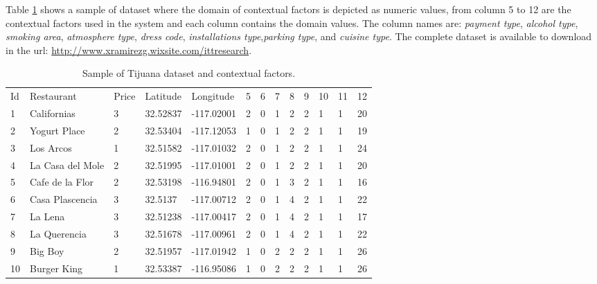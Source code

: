Table \ref{tab:dataset} shows a sample of dataset  where the domain
of contextual factors  is depicted as numeric values, from column 5 to
12  are the contextual factors used in the system and each column
contains the domain values.  The column names are: \textit{payment
type}, \textit{alcohol type}, \textit{smoking area},
\textit{atmosphere type}, \textit{dress code}, \textit{installations
type},\textit{parking type}, and \textit{cuisine type}.
The complete dataset is available to download in the url: 
\url{http://www.xramirezg.wixsite.com/ittresearch}.\\ 
\begin{table}
\small
\captionsetup{font=footnotesize}
\caption{Sample of Tijuana dataset and contextual factors.}
\label{tab:dataset} 
\begin{tabular}{lllllllllllll}
\hline\noalign{\smallskip}
Id &  Restaurant & Price & Latitude &  Longitude & 5 & 6 & 7 & 8 & 9 & 10 & 11 & 12   \\
\noalign{\smallskip}\hline\noalign{\smallskip}
1   &   Californias &   3   &   32.52837    &   -117.02001  &   2   &   0   &   1   &   2   &   2   &   1   &   1   &   20  \\
2   &   Yogurt Place    &   2   &   32.53404    &   -117.12053  &   1   &   0   &   1   &   2   &   2   &   1   &   1   &   19  \\
3   &   Los Arcos   &   1   &   32.51582    &   -117.01032  &   2   &   0   &   1   &   2   &   2   &   1   &   1   &   24  \\
4   &   La Casa del Mole &   2   &   32.51995    &   -117.01001  &   2   &   0   &   1   &   2   &   2   &   1   &   1   &   20  \\
5   &   Cafe de la Flor     &   2   &   32.53198    &   -116.94801  &   2   &   0   &   1   &   3   &   2   &   1   &   1   &   16  \\
6   &   Casa Plascencia &   3   &   32.5137 &   -117.00712  &   2   &   0   &   1   &   4   &   2   &   1   &   1   &   22  \\
7   &   La Lena &   3   &   32.51238    &   -117.00417  &   2   &   0   &   1   &   4   &   2   &   1   &   1   &   17  \\
8   &   La Querencia    &   3   &   32.51678    &   -117.00961  &   2   &   0   &   1   &   4   &   2   &   1   &   1   &   22  \\
9   &   Big Boy &   2   &   32.51957    &   -117.01942  &   1   &   0   &   2   &   2   &   2   &   1   &   1   &   26  \\
10  &   Burger King &   1   &   32.53387    &   -116.95086  &   1   &   0   &   2   &   2   &   2   &   1   &   1   &   26  \\

\end{tabular}
\end{table}
